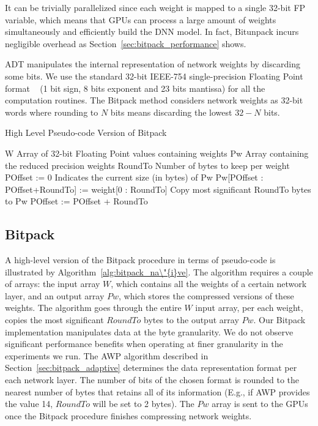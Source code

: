 It can be trivially parallelized since each weight is mapped
to a single 32-bit FP variable, which means that GPUs can process a
large amount of weights simultaneously and efficiently build the DNN model.
In fact, Bitunpack incurs negligible overhead as Section~\ref{sec:bitpack_performance} shows.

ADT manipulates the internal representation of network weights by discarding some bits.
We use the standard 32-bit IEEE-754 single-precision Floating Point format
~\cite{ieee754} (1 bit sign, 8 bits exponent and 23 bits mantissa) for all the computation routines.
The Bitpack method considers network weights as 32-bit 
words where rounding to $N$ bits means discarding the lowest $32-N$ bits.

\begin{algorithm}%
\caption{High Level Pseudo-code Version of Bitpack}
\label{alg:bitpack_na\"{i}ve}
{\fontsize{11}{11}\selectfont
\begin{algorithmic}[1]
    \State W
    \Comment Array of 32-bit Floating Point values containing weights
    \State Pw
    \Comment Array containing the reduced precision weights
    \State RoundTo
    \Comment Number of bytes to keep per weight
    \State POffset := 0
    \Comment Indicates the current size (in bytes) of Pw
        \State Pw[POffset : POffset+RoundTo] := weight[0 : RoundTo]
        \Comment Copy most significant RoundTo bytes to Pw
        \State POffset := POffset + RoundTo
    \EndFor
\end{algorithmic}
}
\end{algorithm}


\subsection{Bitpack}
\label{subsec:bitpack}
A high-level version of the Bitpack procedure in terms of pseudo-code is illustrated by 
Algorithm~\ref{alg:bitpack_na\"{i}ve}.
The algorithm requires a couple of arrays: the input array $W$, which contains all the weights of a certain network layer, and an 
output array $Pw$, which stores the compressed versions of these weights. 
The algorithm goes through 
the entire $W$ input array, per each weight, copies the most 
significant $RoundTo$ bytes to the output array $Pw$.
Our Bitpack implementation manipulates data at the byte granularity.
We do not observe significant performance benefits when operating at finer granularity in the experiments we run.
The AWP algorithm described in Section~\ref{sec:bitpack_adaptive} determines the data representation format per each network layer.  
The number of bits of the chosen format is rounded to the nearest number of bytes
that retains all of its information (E.g., if AWP provides the value 14, $RoundTo$ will be set to 2 bytes).
The $Pw$ array is sent to the GPUs once the Bitpack procedure finishes compressing network weights.

